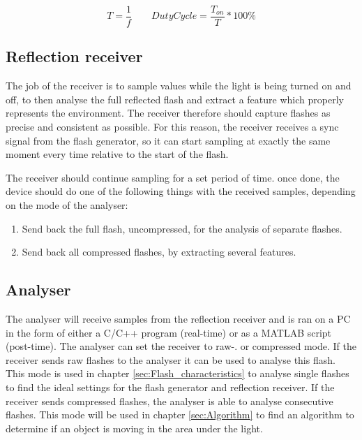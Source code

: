 \begin{equation}
\label{eq:1/f=T}
T=\frac{1}{f}
\qquad
DutyCycle=\frac{T_{on}}{T} * 100\%
\end{equation}


\subsection{Reflection receiver}
The job of the receiver is to sample values while the light is being turned on and off, to then analyse the full reflected flash and extract a feature which properly represents the environment. The receiver therefore should capture flashes as precise and consistent as possible. For this reason, the receiver receives a sync signal from the flash generator, so it can start sampling at exactly the same moment every time relative to the start of the flash. 

The receiver should continue sampling for a set period of time. once done, the device should do one of the following things with the received samples, depending on the mode of the analyser:
\begin{enumerate}[itemsep=-1ex]
	\item Send back the full flash, uncompressed, for the analysis of separate flashes.
	\item Send back all compressed flashes, by extracting several features.
\end{enumerate}

\subsection{Analyser}
The analyser will receive samples from the reflection receiver and is ran on a PC in the form of either a C/C++ program (real-time) or as a MATLAB script (post-time). The analyser can set the receiver to raw-. or compressed mode. If the receiver sends raw flashes to the analyser it can be used to analyse this flash. This mode is used in chapter \ref{sec:Flash_characteristics} to analyse single flashes to find the ideal settings for the flash generator and reflection receiver. If the receiver sends compressed flashes, the analyser is able to analyse consecutive flashes. This mode will be used in chapter \ref{sec:Algorithm} to find an algorithm to determine if an object is moving in the area under the light.

